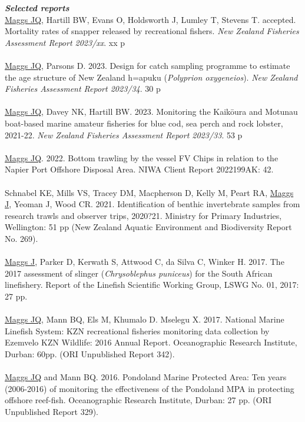 \documentclass[10pt,a4paper]{article}
\begin{document}
\textit{\textbf{Selected reports}}\\
\underline{Maggs JQ}, Hartill BW, Evans O, Holdsworth J, Lumley T, Stevens T. accepted. Mortality rates of snapper released by recreational fishers. \textit{New Zealand Fisheries Assessment Report 2023/xx}. xx p\\
\\
\underline{Maggs JQ}, Parsons D. 2023. Design for catch sampling programme to estimate the age structure of New Zealand h\a=apuku (\textit{Polyprion oxygeneios}). \textit{New Zealand Fisheries Assessment Report 2023/34}. 30 p\\
\\
\underline{Maggs JQ}, Davey NK, Hartill BW. 2023. Monitoring the Kaik\=oura and Motunau boat-based marine amateur fisheries for blue cod, sea perch and rock lobster, 2021-22. \textit{New Zealand Fisheries Assessment Report 2023/33}. 53 p\\
\\
\underline{Maggs JQ}. 2022. Bottom trawling by the vessel FV Chips in relation to the Napier Port Offshore Disposal Area. NIWA Client Report 2022199AK: 42.\\
\\
Schnabel KE, Mills VS, Tracey DM, Macpherson D, Kelly M, Peart RA, \underline{Maggs J}, Yeoman J, Wood CR. 2021. Identification of benthic invertebrate samples from research trawls and observer trips, 2020?21. Ministry for Primary Industries, Wellington: 51 pp (New Zealand Aquatic Environment and Biodiversity Report No. 269).\\
\\
\underline{Maggs J}, Parker D, Kerwath S, Attwood C, da Silva C, Winker H. 2017. The 2017 assessment of slinger (\textit{Chrysoblephus puniceus}) for the South African linefishery. Report of the Linefish Scientific Working Group, LSWG No. 01, 2017: 27 pp.\\
\\
\underline{Maggs JQ}, Mann BQ, Els M, Khumalo D. Mselegu X. 2017. National Marine Linefish System: KZN recreational fisheries monitoring data collection by Ezemvelo KZN Wildlife: 2016 Annual Report. Oceanographic Research Institute, Durban: 60pp. (ORI Unpublished Report 342).\\
\\
\underline{Maggs JQ} and Mann BQ. 2016. Pondoland Marine Protected Area: Ten years (2006-2016) of monitoring the effectiveness of the Pondoland MPA in protecting offshore reef-fish. Oceanographic Research Institute, Durban: 27 pp. (ORI Unpublished Report 329).\\
\end{document}
